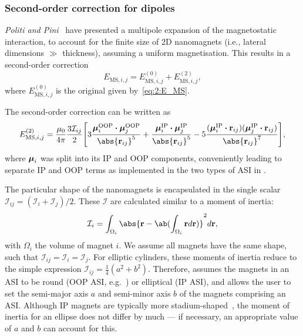\subsubsection{Second-order correction for dipoles}
\textit{Politi and Pini}~\cite{Dipolar2Dparticles} have presented a multipole expansion of the magnetostatic interaction, to account for the finite size of 2D nanomagnets (i.e., lateral dimensions $\gg$ thickness), assuming a uniform magnetisation.
This results in a second-order correction
\begin{equation}
	E_{\mathrm{MS},i,j} = E_{\mathrm{MS},i,j}^\mathrm{(0)} + E_{\mathrm{MS},i,j}^\mathrm{(2)} \mathrm{,}
\end{equation}
where $E_{\mathrm{MS},i,j}^\mathrm{(0)}$ is the original   given by~\cref{eq:2:E_MS}. \par
The second-order correction can be written as
\begin{equation}
	\label{eq:2:E_MS_order2}
	E_{\mathrm{MS},i,j}^\mathrm{(2)} = \frac{\mu_0}{4\pi} \frac{3\mathcal{I}_{ij}}{2} \Bigg[3\frac{\vc{\mu}_i^\mathrm{OOP} \bcdot \vc{\mu}_j^\mathrm{OOP}}{\abs{\vc{r}_{ij}}^5} + \frac{\vc{\mu}_i^\mathrm{IP} \bcdot \vc{\mu}_j^\mathrm{IP}}{\abs{\vc{r}_{ij}}^5} -5\frac{(\vc{\mu}_i^\mathrm{IP} \bcdot \vc{r}_{ij}) (\vc{\mu}_j^\mathrm{IP} \bcdot \vc{r}_{ij})}{\abs{\vc{r}_{ij}}^7} \Bigg] \mathrm{,}
\end{equation}
where $\boldsymbol{\mathbf{\mu}}_i$ was split into its IP and OOP components, conveniently leading to separate IP and OOP terms as implemented in the two types of ASI in \hotspice. \par
The particular shape of the nanomagnets is encapsulated in the single scalar $\mathcal{I}_{ij} = (\mathcal{I}_i + \mathcal{I}_j)/2$.
These $\mathcal{I}$ are calculated similar to a moment of inertia:
\begin{equation}
	\mathcal{I}_i = \int_{\Omega_i} \abs{\vc{r} - \ab(\int_{\Omega_i} \vc{r} d\vc{r})}^2 d\vc{r} \mathrm{,}
\end{equation}
with $\Omega_i$ the volume of magnet $i$.
We assume all magnets have the same shape, such that $\mathcal{I}_{ij} = \mathcal{I}_i = \mathcal{I}_j$.
For elliptic cylinders, these moments of inertia reduce to the simple expression $\mathcal{I}_{ij} = \frac{1}{4}(a^2 + b^2)$.
Therefore, \hotspice assumes the magnets in an ASI to be round (OOP ASI, e.g.~\cite{PerpendicularMagnetizationASI}) or elliptical (IP ASI), and allows the user to set the semi-major axis $a$ and semi-minor axis $b$ of the magnets comprising an ASI.
Although IP magnets are typically more stadium-shaped~\cite{EmergentChiralityRatchet,clocking-protocol}, the moment of inertia for an ellipse does not differ by much --- if necessary, an appropriate value of $a$ and $b$ can account for this.

